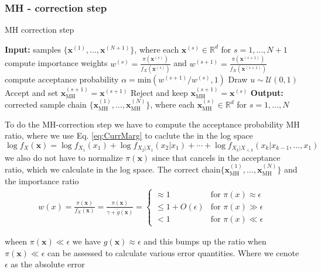 \subsubsection{MH - correction step}
\begin{algorithm}[!ht]
	\caption{MH correction step}
	\begin{algorithmic}[1]
		\STATE \textbf{Input:} samples $\{ \bm{x}^{(1)},\dots, \bm{x}^{(N+1)} \} $, where each $\bm{x}^{(s)} \in \mathbb{R}^d$ for $s = 1, \dots, N+1$
		\STATE compute importance weights $w^{(s)} = \frac{\pi(\bm{x}^{(s)})}{f_X(\bm{x}^{(s)})}$ and $w^{(s+1)} =  \frac{\pi(\bm{x}^{(s+1)})}{f_X(\bm{x}^{(s+1)})} $ 
		\STATE compute acceptance probability $\alpha = \text{min}(w^{(s+1)}/w^{(s)}, 1)$ 
		\STATE Draw $u \sim \mathcal{U}(0,1)$
		\STATE Accept and set $\bm{x}_{\text{MH}}^{(s+1)} = \bm{x}^{(s+1)}$
		\ELSE  
		\STATE Reject and keep $\bm{x}_{\text{MH}}^{(s+1)} = \bm{x}^{(s)}$
		\ENDIF
		\ENDFOR
		\STATE \textbf{Output:} corrected sample chain $\{ \bm{x}_{\text{MH}}^{(1)},\dots, \bm{x}_{\text{MH}}^{(N)} \} $, where each $\bm{x}_{\text{MH}}^{(s)} \in \mathbb{R}^d$ for $s = 1, \dots, N$
	\end{algorithmic}
	\label{alg:SIRT}
\end{algorithm}
To do the MH-correction step we have to compute the acceptance probability MH ratio, where we use Eq. \ref{eq:CurrMarg} to caclute the in the log space $\log f_X(\bm{x}) =  \log f_{X_1}(x_1) + \log f_{X_2|X_1}(x_2|x_1) + \cdots + \log f_{X_k|X_{<k}}(x_k|x_{k-1},\dots,x_1)$
we also do not have to normalize $\pi(\bm{x})$ since that cancels in the acceptance ratio, which we calculate in the log space.
The correct chain$ \{ \bm{x}_{\text{MH}}^{(1)},\dots, \bm{x}_{\text{MH}}^{(N)} \} $ and the importance ratio
\begin{align}
	w(x) = \frac{\pi(\bm{x})}{f_X(\bm{x})} = \frac{\pi(\bm{x})}{\gamma + \tilde{g}(\bm{x})} =
	\begin{cases}
		\approx 1  &\text{for } \pi(x) \approx \epsilon \\
		\leq 1 + O(\epsilon) &\text{for } \pi(x) \gg \epsilon\\
		< 1  & \text{for } \pi(x) \ll \epsilon 
	\end{cases}
\end{align}

wheen $\pi(\bm{x}) \ll \epsilon$ we have $g(\bm{x}) \approx \epsilon $ and this bumps up the ratio
when $\pi(\bm{x}) \ll \epsilon$
can be assessed to calculate various error quantities.
Where we cenote $\epsilon$ as the absolute error


